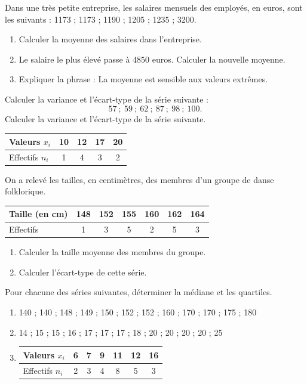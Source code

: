 \exo

Dans une très petite entreprise, les salaires mensuels des employés, en euros, sont les suivants : 1173 ; 1173 ; 1190 ; 1205 ; 1235 ; 3200.

\begin{enumerate}
\item Calculer la moyenne des salaires dans l'entreprise.
\item Le salaire le plus élevé passe à $4850$ euros. Calculer la nouvelle moyenne.
\item Expliquer la phrase : \og La moyenne est sensible aux valeurs extrêmes. \fg{}
\end{enumerate}


\exo
Calculer la variance et l'écart-type de la série suivante :
\[
57\ ;\ 59\ ;\ 62\ ;\ 87\ ;\ 98\ ;\ 100.
\]
\exo
Calculer la variance et l'écart-type de la série suivante.

\begin{tabular}{| l | c | c | c | c |}
     \hline
     Valeurs $x_i$ & 10 & 12 & 17 & 20 \\ \hline
     Effectifs $n_i$ & 1 & 4 & 3 & 2  \\ 
     \hline
   \end{tabular}
\exo
On a relevé les tailles, en centimètres, des membres d'un groupe de danse folklorique.
   
   \begin{tabular}{| l | c | c | c | c | c | c |}
     \hline
     Taille (en cm) & 148 & 152 & 155 & 160 & 162 & 164 \\ \hline
     Effectifs & 1 & 3 & 5 & 2 & 5 & 3  \\ 
     \hline
   \end{tabular}
   
   \begin{enumerate}
\item Calculer la taille moyenne des membres du groupe.
\item Calculer l'écart-type de cette série.
   \end{enumerate}
   
\exo
   Pour chacune des séries suivantes, déterminer la médiane et les quartiles.
   \begin{enumerate}
   \item 140 ; 140 ; 148 ; 149 ; 150 ; 152 ; 152 ; 160 ; 170 ; 170 ; 175 ; 180
   \item 14 ; 15 ; 15 ; 16 ; 17 ; 17 ; 17 ; 18 ; 20 ; 20 ; 20 ; 20 ; 25
   \item \begin{tabular}{| l | c | c | c | c | c | c |}
     \hline
     Valeurs $x_i$ & 6 & 7 & 9 & 11 & 12 & 16 \\ \hline
     Effectifs $n_i$ & 2 & 3 & 4 & 8 & 5 & 3  \\ 
     \hline
   \end{tabular}
   \end{enumerate}
   
